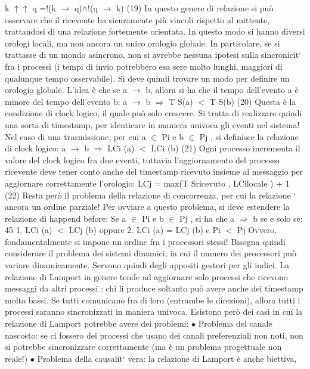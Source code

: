 k $\uparrow$$\uparrow$ q =!(k $\rightarrow$ q)$\land$!(q $\rightarrow$ k)
(19)
In questo genere di relazione si può osservare che il ricevente ha sicuramente più
vincoli rispetto al mittente, trattandosi di una relazione fortemente orientata.
In questo modo si hanno diversi orologi locali, ma non ancora un unico orologio globale. In particolare, se si trattasse
di un mondo asincrono, non si avrebbe
nessuna ipotesi sulla sincronicit` fra i processi (i tempi di invio potrebbero esa
sere molto lunghi, maggiori di qualunque tempo osservabile). Si deve quindi
trovare un modo per definire un orologio globale.
L'idea è che se a $\rightarrow$ b, allora si ha che il tempo dell'evento a è minore del
tempo dell'evento b:
a $\rightarrow$ b $\Rightarrow$ T S(a) $<$ T S(b)
(20)
Questa è la condizione di clock logico, il quale può solo crescere. Si tratta di
realizzare quindi una sorta di timestamp, per identicare in maniera univoca gli
eventi nel sistema!
Nel caso di una trasmissione, per cui a $\in$ Pi e b $\in$ Pj , si definisce la relazione
di clock logico:
a $\rightarrow$ b $\Rightarrow$ LCi (a) $<$ LCi (b)
(21)
Ogni processo incrementa il valore del clock logico fra due eventi, tuttavia
l'aggiornamento del processo ricevente deve tener conto anche del timestamp
ricevuto insieme al messaggio per aggiornare correttamente l'orologio:
LCj = max(T Sricevuto , LCilocale ) + 1
(22)
Resta però il problema della relazione di concorrenza, per cui la relazione `
ancora un ordine parziale! Per ovviare a questo problema, si deve estendere la
relazione di happend before:
Se a $\in$ Pi e b $\in$ Pj , si ha che a $\Rightarrow$ b se e solo se:
45
1. LCi (a) $<$ LCj (b) oppure
2. LCi (a) = LCj (b) e Pi $<$ Pj
Ovvero, fondamentalmente si impone un ordine fra i processori stessi! Bisogna
quindi considerare il problema dei sistemi dinamici, in cui il numero dei processori può variare dinamicamente. Servono
quindi degli appositi gestori per gli
indici.
La relazione di Lamport in genere tende ad aggiornare solo processi che
ricevono messaggi da altri processi : chi li produce soltanto può avere anche dei
timestamp molto bassi. Se tutti comunicano fra di loro (entrambe le direzioni),
allora tutti i processi saranno sincronizzati in maniera univoca. Esistono però
dei casi in cui la relazione di Lamport potrebbe avere dei problemi:
$\bullet$ Problema del canale nascosto: se ci fossero dei processi che usano dei
canali preferenziali non noti, non si potrebbe sincronizzare correttamente
(ma è un problema progettuale non reale!)
$\bullet$ Problema della causalit` vera: la relazione di Lamport è anche biettiva,
$$

